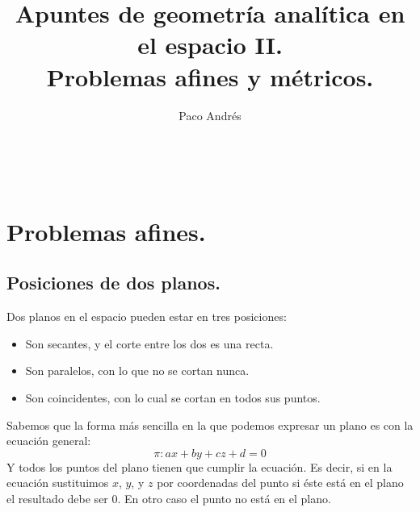 \documentclass[a4paper,11pt,answers]{exam}
\def \autor{Paco Andrés}
\def \titulo{Apuntes de geometría analítica en el espacio II.\\Problemas afines y métricos.}
\begin{document}
\title{\titulo}
\date{}
\author{\autor}
\maketitle

\begin{center}
\doclicenseLongText\\
\vspace{.25cm}
\doclicenseImage
\end{center}
\section{Problemas afines.}
\subsection{Posiciones de dos planos.}
Dos planos en el espacio pueden estar en tres posiciones:
\begin{itemize}
	\item Son secantes, y el corte entre los dos es una recta.
	\item Son paralelos, con lo que no se cortan nunca.
	\item Son coincidentes, con lo cual se cortan en todos sus puntos.
\end{itemize}

Sabemos que la forma más sencilla en la que podemos expresar un plano es con la ecuación general:
\[\pi: ax + by + cz + d = 0\]
Y todos los puntos del plano tienen que cumplir la ecuación. Es decir, si en la ecuación sustituimos $x$, $y$, y $z$ por coordenadas del punto si éste está en el plano el resultado debe ser 0. En otro caso el punto no está en el plano.\\
\end{document}
